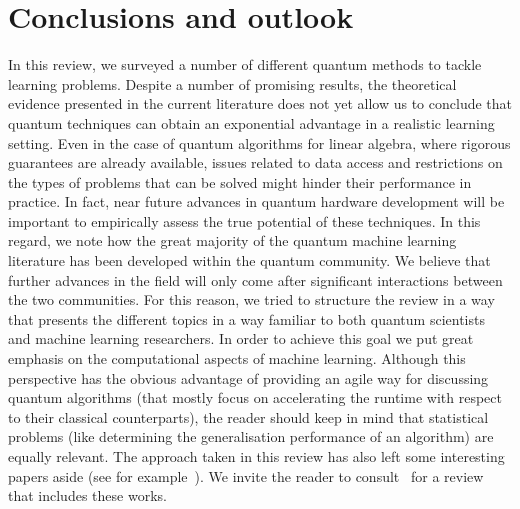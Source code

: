 \documentclass[a4paper, 11pt]{article}
\begin{document}
\section{Conclusions and outlook}
\label{sec:outlook}

In this review, we surveyed a number of different quantum methods to tackle learning problems. 
Despite a number of promising results, the theoretical evidence presented in the current literature does not yet allow us to conclude that quantum techniques can obtain an exponential advantage in a realistic learning setting. Even in the case of quantum algorithms for linear algebra, where rigorous guarantees are already available, issues related to data access and restrictions on the types of problems that can be solved might hinder their performance in practice.
In fact, near future advances in quantum hardware development will be important to empirically assess the true potential of these techniques. In this regard, we note how the great majority of the quantum machine learning literature has been developed within the quantum community. We believe that further advances in the field will only come after significant interactions between the two communities. For this reason, we tried to structure the review in a way that presents the different topics in a way familiar to both quantum scientists and machine learning researchers. In order to achieve this goal we put great emphasis on the computational aspects of machine learning. Although this perspective has the obvious advantage of providing an agile way for discussing quantum algorithms (that mostly focus on accelerating the runtime with respect to their classical counterparts), the reader should keep in mind that statistical problems (like determining the generalisation performance of an algorithm) are equally relevant. The approach taken in this review has also left some interesting papers aside (see for example~\cite{lloyd2014quantum}). We invite the reader to consult~\cite{schuld2014introduction,adcock2015advances, biamonte2016quantum} for a review that includes these works.\\
\end{document}
